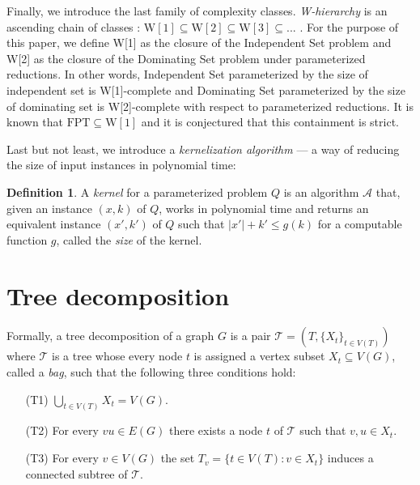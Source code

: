 \documentclass[en]{pracamgr}
\theoremstyle{definition}
\newtheorem{definition}{Definition}
\newcommand{\domsetp}{{\sc Dominating Set}}
\newcommand{\indset}{{\sc Independent Set}}
\newcommand{\w}[1]{\textrm{W}[#1]}
\begin{document}
Finally, we introduce the last family of complexity classes. \emph{W-hierarchy} is an ascending chain of classes : $\w{1} \subseteq \w{2} \subseteq \w{3} \subseteq...$ . For the purpose of this paper, we define \w{1} as the closure of the \indset{} problem and \w{2} as the closure of the \domsetp{} problem under parameterized reductions. In other words, \indset{} parameterized by the size of independent set is  \w{1}-complete and \domsetp{} parameterized by the size of dominating set is \w{2}-complete with respect to parameterized reductions. It is known that $\textrm{FPT} \subseteq \w{1}$ and it is conjectured that this containment is strict.

Last but not least, we introduce a \emph{kernelization algorithm} --- a way of reducing the size of input instances in polynomial time:

\begin{definition}\label{Kernel}
	A \textit{kernel} for a parameterized problem $Q$ is an algorithm $\mathcal{A}$ that, given an instance $(x,k)$ of $Q$, works in polynomial time and returns an equivalent instance $(x',k')$ of $Q$
	such that $|x'| + k' \leq g(k)$ for a computable function $g$, called the \textit{size} of the kernel.
\end{definition}

\section{Tree decomposition}

Formally, a tree decomposition of a graph $G$ is a pair $\mathcal{T} = (T, \{X_t\}_{t\in V(T)})$ where $\mathcal{T}$ is a tree whose every node $t$ is assigned a vertex subset $X_t \subseteq V(G)$, called a \emph{bag}, such that the following three conditions hold:
\begin{itemize}
	\item[(T1)] $\bigcup_{t\in V(T)}X_t = V(G)$.
	\item[(T2)] For every $vu \in E(G)$ there exists a node $t$ of $\mathcal{T}$ such that $v,u \in X_t$.
	\item[(T3)] For every $v \in V(G)$ the set $T_v = \{t \in V(T): v \in X_t\}$ induces a connected subtree of $\mathcal{T}$.
\end{itemize}
\end{document}

